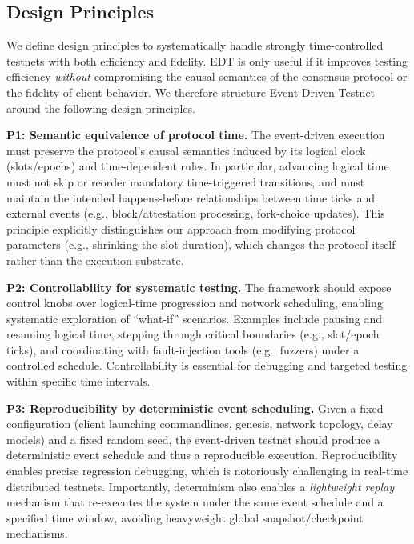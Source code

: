 \subsection{Design Principles}
\label{sec:design_principles}

We define design principles to systematically handle strongly time-controlled testnets with both efficiency and fidelity. EDT is only useful if it improves testing efficiency \emph{without} compromising the causal semantics of the consensus protocol or the fidelity of client behavior.
We therefore structure Event-Driven Testnet around the following design principles.

\smallskip
\noindent\textbf{P1: Semantic equivalence of protocol time.}
The event-driven execution must preserve the protocol's causal semantics induced by its logical clock (slots/epochs) and time-dependent rules.
In particular, advancing logical time must not skip or reorder mandatory time-triggered transitions, and must maintain the intended happens-before relationships between time ticks and external events (e.g., block/attestation processing, fork-choice updates).
This principle explicitly distinguishes our approach from modifying protocol parameters (e.g., shrinking the slot duration), which changes the protocol itself rather than the execution substrate.

\smallskip
\noindent\textbf{P2: Controllability for systematic testing.}
The framework should expose control knobs over logical-time progression and network scheduling, enabling systematic exploration of ``what-if'' scenarios.
Examples include pausing and resuming logical time, stepping through critical boundaries (e.g., slot/epoch ticks), and coordinating with fault-injection tools (e.g., fuzzers) under a controlled schedule.
Controllability is essential for debugging and targeted testing within specific time intervals.

\smallskip
\noindent\textbf{P3: Reproducibility by deterministic event scheduling.}
Given a fixed configuration (client launching commandlines, genesis, network topology, delay models) and a fixed random seed, the event-driven testnet should produce a deterministic event schedule and thus a reproducible execution.
Reproducibility enables precise regression debugging, which is notoriously challenging in real-time distributed testnets.
Importantly, determinism also enables a \emph{lightweight replay} mechanism that re-executes the system under the same event schedule and a specified time window, avoiding heavyweight global snapshot/checkpoint mechanisms.

